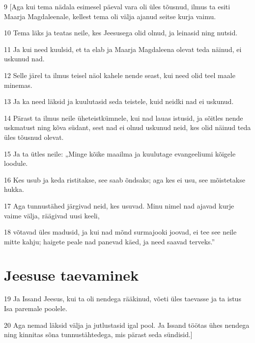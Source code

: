 \par 9 [Aga kui tema nädala esimesel päeval vara oli üles tõusnud, ilmus ta esiti Maarja Magdaleenale, kellest tema oli välja ajanud seitse kurja vaimu.
\par 10 Tema läks ja teatas neile, kes Jeesusega olid olnud, ja leinasid ning nutsid.
\par 11 Ja kui need kuulsid, et ta elab ja Maarja Magdaleena olevat teda näinud, ei uskunud nad.
\par 12 Selle järel ta ilmus teisel näol kahele nende seast, kui need olid teel maale minemas.
\par 13 Ja ka need läksid ja kuulutasid seda teistele, kuid neidki nad ei uskunud.
\par 14 Pärast ta ilmus neile üheteistkümnele, kui nad lauas istusid, ja sõitles nende uskmatust ning kõva südant, sest nad ei olnud uskunud neid, kes olid näinud teda üles tõusnud olevat.
\par 15 Ja ta ütles neile: „Minge kõike maailma ja kuulutage evangeeliumi kõigele loodule.
\par 16 Kes usub ja keda ristitakse, see saab õndsaks; aga kes ei usu, see mõistetakse hukka.
\par 17 Aga tunnustähed järgivad neid, kes usuvad. Minu nimel nad ajavad kurje vaime välja, räägivad uusi keeli,
\par 18 võtavad üles madusid, ja kui nad mõnd surmajooki joovad, ei tee see neile mitte kahju; haigete peale nad panevad käed, ja need saavad terveks.”

\section*{Jeesuse taevaminek}

\par 19 Ja Issand Jeesus, kui ta oli nendega rääkinud, võeti üles taevasse ja ta istus Isa paremale poolele.
\par 20 Aga nemad läksid välja ja jutlustasid igal pool. Ja Issand töötas ühes nendega ning kinnitas sõna tunnustähtedega, mis pärast seda sündisid.]





